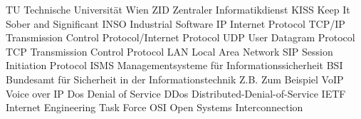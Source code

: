 	{TU}				{Technische Universit\"at Wien}
	{ZID}				{Zentraler Informatikdienst}
	{KISS}		{Keep It Sober and Significant}
 {INSO}		{Industrial Software}
 {IP}				{Internet Protocol}
 {TCP/IP}	{Transmission Control Protocol/Internet Protocol}
 {UDP}			{User Datagram Protocol}
 {TCP}			{Transmission Control Protocol}
 {LAN}			{Local Area Network}
 {SIP}			{Session Initiation Protocol}
 {ISMS} 		{Managementsysteme für Informationssicherheit}
 {BSI}			{Bundesamt für Sicherheit in der Informationstechnik}
 {Z.B.}			{Zum Beispiel}
 {VoIP}			{Voice over IP}
 {Dos}			{Denial of Service}
 {DDos}		{Distributed-Denial-of-Service}
 {IETF}			{Internet Engineering Task Force}
 {OSI}			{Open Systems Interconnection}
